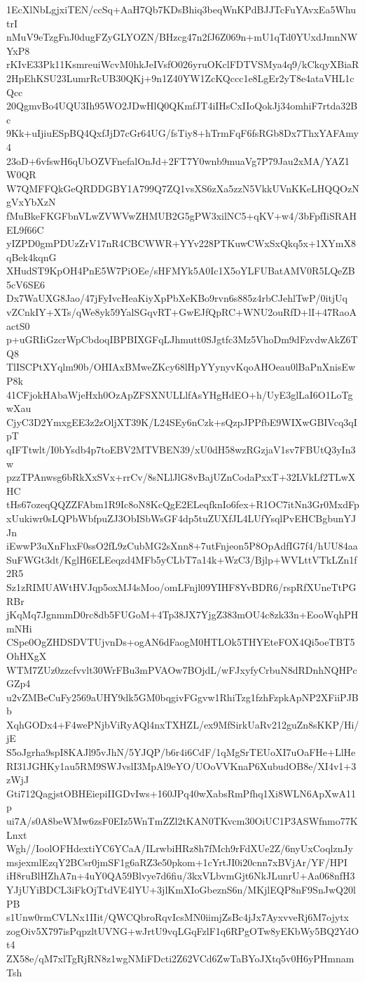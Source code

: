 1EcXlNbLgjxiTEN/ccSq+AaH7Qb7KDsBhiq3beqWnKPdBJJTcFuYAvxEa5WhutrI
nMuV9eTzgFnJ0dugFZyGLYOZN/BHzcg47n2fJ6Z069n+mU1qTd0YUxdJmnNWYxP8
rKIvE33Pk11KsmreuiWcvM0hkJeIVsfO026yruOKclFDTVSMya4q9/kCkqyXBiaR
2HpEhKSU23LumrRcUB30QKj+9n1Z40YW1ZcKQccc1e8LgEr2yT8e4ataVHL1cQcc
20QgmvBo4UQU3Ih95WO2JDwHlQ0QKmfJT4iIHsCxIIoQokJj34omhiF7rtda32Bc
9Kk+uIjiuESpBQ4QxfJjD7cGr64UG/fsTiy8+hTrmFqF6fsRGb8Dx7ThxYAFAmy4
23oD+6vfswH6qUbOZVFnefalOnJd+2FT7Y0wnb9muaVg7P79Jau2xMA/YAZ1W0QR
W7QMFFQkGeQRDDGBY1A799Q7ZQ1vsXS6zXa5zzN5VkkUVnKKeLHQQOzNgVxYbXzN
fMuBkeFKGFbnVLwZVWVwZHMUB2G5gPW3xilNC5+qKV+w4/3bFpfIiSRAHEL9f66C
yIZPD0gmPDUzZrV17nR4CBCWWR+YYv228PTKuwCWxSxQkq5x+1XYmX8qBek4kqnG
XHudST9KpOH4PnE5W7PiOEe/sHFMYk5A0Ic1X5oYLFUBatAMV0R5LQeZB5cV6SE6
Dx7WaUXG8Jao/47jFyIvcHeaKiyXpPbXeKBo9rvn6s885z4rbCJehlTwP/0itjUq
vZCnkIY+XTs/qWe8yk59YalSGqvRT+GwEJfQpRC+WNU2ouRfD+lI+47RaoAactS0
p+uGRIiGzcrWpCbdoqIBPBIXGFqLJhmutt0SJgtfc3Mz5VhoDm9dFzvdwAkZ6TQ8
TlISCPtXYqlm90b/OHIAxBMweZKcy68lHpYYynyvKqoAHOeau0lBaPnXnisEwP8k
41CFjokHAbaWjeHxh0OzApZFSXNULLlfAsYHgHdEO+h/UyE3glLaI6O1LoTgwXau
CjyC3D2YmxgEE3z2zOljXT39K/L24SEy6nCzk+sQzpJPPfbE9WIXwGBIVcq3qIpT
qIFTtwlt/I0bYsdb4p7toEBV2MTVBEN39/xU0dH58wzRGzjaV1sv7FBUtQ3yIn3w
pzzTPAnwsg6bRkXxSVx+rrCv/8sNLlJlG8vBajUZnCodaPxxT+32LVkLf2TLwXHC
tHs67ozeqQQZZFAbm1R9Ic8oN8KcQgE2ELeqfknIo6fex+R1OC7itNn3Gr0MxdFp
xUukiwr0sLQPbWbfpuZJ3ObISbWsGF4dp5tuZUXfJL4LUfYsqlPvEHCBgbunYJJn
iEwwP3uXnFhxF0ssO2fL9zCubMG2sXnn8+7utFnjeon5P8OpAdfIG7f4/hUU84aa
SuFWGt3dt/KglH6ELEeqzd4MFb5yCLbT7a14k+WzC3/Bjlp+WVLttVTkLZn1f2R5
Sz1zRIMUAWtHVJqp5oxMJ4sMoo/omLFnjl09YIHF8YvBDR6/rspRfXUneTtPGRBr
jKqMq7JgnmmD0rc8db5FUGoM+4Tp38JX7YjgZ383mOU4c8zk33n+EooWqhPHmNHi
CSpe0OgZHDSDVTUjvnDs+ogAN6dFaogM0HTLOk5THYEteFOX4Qi5oeTBT5OhHXgX
WTM7ZUz0zzcfvvlt30WrFBu3mPVAOw7BOjdL/wFJxyfyCrbuN8dRDnhNQHPcGZp4
u2vZMBeCuFy2569aUHY9dk5GM0bqgivFGgvw1RhiTzg1fzhFzpkApNP2XFiiPJBb
XqhGODx4+F4wePNjbViRyAQl4nxTXHZL/ex9MfSirkUaRv212guZn8sKKP/Hi/jE
S5oJgrha9spI8KAJl95vJhN/5YJQP/b6r4i6CdF/1qMgSrTEUoXI7uOaFHe+LlHe
RI31JGHKy1au5RM9SWJvslI3MpAl9eYO/UOoVVKnaP6XubudOB8e/XI4v1+3zWjJ
Gti712QagjstOBHEiepiIIGDvIws+160JPq40wXabsRmPfhq1Xi8WLN6ApXwA11p
ui7A/s0A8beWMw6zsF0EIz5WnTmZZl2tKAN0TKvcm30OiUC1P3ASWfnmo77KLnxt
Wgh//IoolOFHdextiYC6YCaA/ILrwbiHRz8h7fMch9rFdXUe2Z/6nyUxCoqlznJy
msjexmlEzqY2BCsr0jmSF1g6aRZ3e50pkom+1cYrtJI0i20cnn7xBVjAr/YF/HPI
iH8ruBlHZhA7n+4uY0QA59Blvye7d6fiu/3kxVLbvmGjt6NkJLunrU+Aa068nfH3
YJjUYiBDCL3iFkOjTtdVE4lYU+3jlKmXIoGbeznS6n/MKjlEQP8nF9SnJwQ20lPB
s1Unw0rmCVLNx1IIit/QWCQbroRqvIcsMN0iimjZsBc4jJx7AyxvveRj6M7ojytx
zogOiv5X797isPqpzltUVNG+wJrtU9vqLGqFzlF1q6RPgOTw8yEKbWy5BQ2YdOt4
ZX58e/qM7xlTgRjRN8z1wgNMiFDcti2Z62VCd6ZwTaBYoJXtq5v0H6yPHmnamTsh
